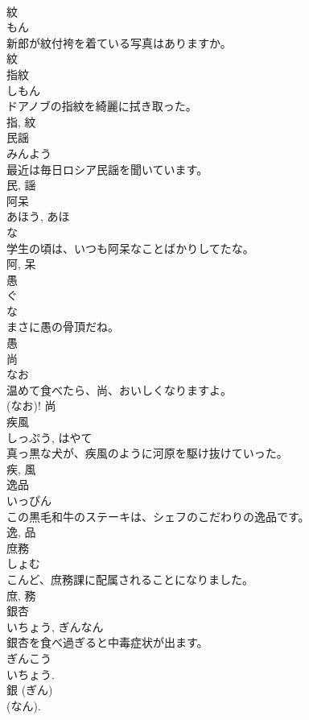 \documentclass[8pt]{extreport}
\begin{document}
\begin{CJK}{UTF8}{min}
\\	紋	
\\	もん	
\\	新郎が紋付袴を着ている写真はありますか。	
\\	紋	
\\	指紋	
\\	しもん	
\\	ドアノブの指紋を綺麗に拭き取った。	
\\	指, 紋	
\\	民謡	
\\	みんよう	
\\	最近は毎日ロシア民謡を聞いています。	
\\	民, 謡	
\\	阿呆	
\\	あほう, あほ	
\\	な 
\\	学生の頃は、いつも阿呆なことばかりしてたな。	
\\	阿, 呆	
\\	愚	
\\	ぐ	
\\	な 
\\	まさに愚の骨頂だね。	
\\	愚	
\\	尚	
\\	なお	
\\	温めて食べたら、尚、おいしくなりますよ。	
\\	(なお)!	尚	
\\	疾風	
\\	しっぷう, はやて	
\\	真っ黒な犬が、疾風のように河原を駆け抜けていった。	
\\	疾, 風	
\\	逸品	
\\	いっぴん	
\\	この黒毛和牛のステーキは、シェフのこだわりの逸品です。	
\\	逸, 品	
\\	庶務	
\\	しょむ	
\\	こんど、庶務課に配属されることになりました。	
\\	庶, 務	
\\	銀杏	
\\	いちょう, ぎんなん	
\\	銀杏を食べ過ぎると中毒症状が出ます。	
\\	ぎんこう 
\\	いちょう. 
\\	銀 (ぎん) 
\\	(なん). 

\end{CJK}
\end{document}
